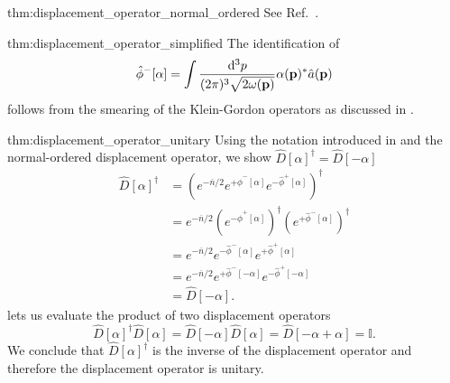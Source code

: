 \begin{delayedproof}{thm:displacement_operator_normal_ordered}
	See Ref.~\cite[p.~48]{Barnett2002}.
\end{delayedproof}
\begin{delayedproof}{thm:displacement_operator_simplified}
	The identification of
	\begin{equation*}
		\hat\phi^-[\alpha]
		=
		\int\frac{\dd[3]{p}}{(2\pi)^3\sqrt{2\omega(\vb{p})}}
		\alpha(\vb{p})^*
		\hat{a}(\vb{p})
	\end{equation*}
	follows from the smearing of the Klein-Gordon operators as discussed in .
\end{delayedproof}
\begin{delayedproof}{thm:displacement_operator_unitary}
	Using the notation introduced in  and the normal-ordered displacement operator, we show $\hat{D}[\alpha]^\dagger=\hat{D}[-\alpha]$
	\begin{equation*}
		\begin{split}
			\hat{D}[\alpha]^\dagger
			&=
			\left(
				e^{-\overline{n}/2}
				e^{+\hat\phi^-[\alpha]}
				e^{-\hat\phi^+[\alpha]}
			\right)^\dagger
			\\
			&=
			e^{-\overline{n}/2}
			\left(
				e^{-\hat\phi^+[\alpha]}
			\right)^\dagger
			\left(
				e^{+\hat\phi^-[\alpha]}
			\right)^\dagger
			\\
			&=
			e^{-\overline{n}/2}
			e^{-\hat\phi^-[\alpha]}
			e^{+\hat\phi^+[\alpha]}
			\\
			&=
			e^{-\overline{n}/2}
			e^{+\hat\phi^-[-\alpha]}
			e^{-\hat\phi^+[-\alpha]}
			\\
			&=
			\hat{D}[-\alpha]
			.
		\end{split}
	\end{equation*}
	 lets us evaluate the product of two displacement operators
	\begin{equation*}
		\hat{D}[\alpha]^\dagger
		\hat{D}[\alpha]
		=
		\hat{D}[-\alpha]
		\hat{D}[\alpha]
		=
		\hat{D}[-\alpha+\alpha]
		=
		\mathbb{I}
		.
	\end{equation*}
	We conclude that $\hat{D}[\alpha]^\dagger$ is the inverse of the displacement operator and therefore the displacement operator is unitary.
\end{delayedproof}
